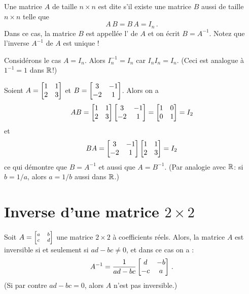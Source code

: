 \begin{definition}
Une matrice $A$ de taille $n \times n$ est dite  s'il existe une matrice $B$ aussi de taille $n \times n$ telle que
$$
A\,B = B\,A = I_n\,.
$$
Dans ce cas, la matrice $B$ est appell\'ee l' de $A$ et on \'ecrit $B = A^{-1}$. Notez que l'inverse $A^{-1}$ de $A$ est unique !
\end{definition}

\begin{myexample}  Consid\'erons le cas $A=I_n$.  Alors $I_n^{-1} = I_n$ car $I_n I_n = I_n$.
(Ceci est analogue \`a  $1^{-1} = 1$ dans $\mathbb{R}$!) \end{myexample}

\begin{myexample} Soient $A = \left[ \begin{matrix} 1 & 1 \\ 2& 3 \end{matrix} \right]$ et $B = \left[ \begin{matrix} 3 & -1\\ -2 & 1 \end{matrix} \right]$.
Alors on a
$$
AB = \left[ \begin{matrix} 1 & 1 \\ 2& 3 \end{matrix} \right]\left[ \begin{matrix} 3 & -1\\ -2 & 1 \end{matrix} \right] = \left[ \begin{matrix} 1&0\\0&1 \end{matrix} \right] = I_2
$$
et
$$
BA = \left[ \begin{matrix} 3 & -1\\ -2 & 1 \end{matrix} \right] \left[ \begin{matrix} 1 & 1 \\ 2& 3 \end{matrix} \right] = I_2
$$
ce qui d\'emontre que $B = A^{-1}$ et aussi que $A = B^{-1}$.  (Par analogie avec $\mathbb{R}$:  si $b=1/a$, alors $a=1/b$ aussi dans $\mathbb{R}$.) \end{myexample}

\section{Inverse d'une matrice $2\times 2$}\label{section:inverse2by2}

\begin{lemma}\label{inverse2by2}
Soit $A = \scriptsize\left[ \begin{matrix} a & b \\ c& d \end{matrix} \right]$ une matrice $2\times 2$ à coefficients réels.  Alors, la matrice $A$ est inversible si et seulement si $ad-bc \neq 0$, et dans ce cas on a :
$$
A^{-1} = \frac{1}{ad-bc} \left[ \begin{matrix} d & -b \\ -c & a \end{matrix} \right]\,.
$$
(Si par contre $ad-bc=0$, alors $A$ n'est pas inversible.)
\end{lemma}

